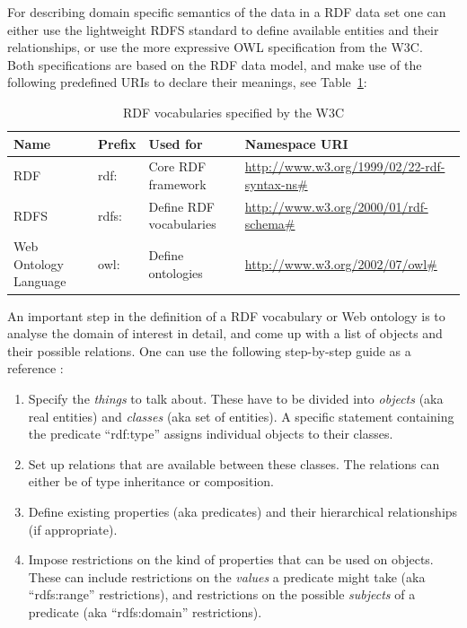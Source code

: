 For describing domain specific semantics of the data in a \gls{RDF} data set one can either use the lightweight \gls{RDFS} standard to define available entities and their relationships, or use the more expressive \gls{OWL} specification from the \gls{W3C}. \\

Both specifications are based on the \gls{RDF} data model, and make use of the following predefined \gls{URI}s to declare their meanings, see Table~\ref{tab:w3c_vocab_rdf}: \@

\begin{table}[H]
\centering
\begin{tabular}{p{3cm}llp{4.5cm}}
\hline
\textbf{Name} & \textbf{Prefix} & \textbf{Used for} & \textbf{Namespace URI} \\
\hline
\gls{RDF} & rdf: & Core \gls{RDF} framework & \url{http://www.w3.org/1999/02/22-rdf-syntax-ns\#} \\
\hline
\gls{RDFS} & rdfs: & Define \gls{RDF} vocabularies & \url{http://www.w3.org/2000/01/rdf-schema\#} \\
\hline
Web Ontology Language & owl: & Define ontologies & \url{http://www.w3.org/2002/07/owl\#} \\
\hline
\end{tabular}
\caption[\gls{RDF} vocabularies specified by the \gls{W3C}]{\gls{RDF} vocabularies specified by the \gls{W3C} \citep[pg. 41]{wood2014linked}}
\label{tab:w3c_vocab_rdf}
\end{table}

An important step in the definition of a \gls{RDF} vocabulary or Web ontology is to analyse the domain of interest in detail, and come up with a list of objects and their possible relations. One can use the following step-by-step guide as a reference \citep[pg. 40-55]{antoniou2012semantic}: \@

\begin{enumerate}
	\item Specify the \emph{things} to talk about. These have to be divided into \emph{objects} (aka real entities) and \emph{classes} (aka set of entities). A specific statement containing the predicate ``rdf:type'' assigns individual objects to their classes.
	\item Set up relations that are available between these classes. The relations can either be of type inheritance or composition.
	\item Define existing properties (aka predicates) and their hierarchical relationships (if appropriate).
	\item Impose restrictions on the kind of properties that can be used on objects. These can include restrictions on the \emph{values} a predicate might take (aka ``rdfs:range'' restrictions), and restrictions on the possible \emph{subjects} of a predicate (aka ``rdfs:domain'' restrictions).
\end{enumerate}

